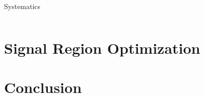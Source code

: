 \documentclass{beamer}
\begin{document}
\begin{frame}{Systematics}
\begin{columns}
\begin{column}{0.55\textwidth}
    \end{column}
  \end{columns}


\end{frame}








\section[Signal Region Optimization]{Signal Region Optimization}









\section[Conclusion]{Conclusion}

\end{document}

